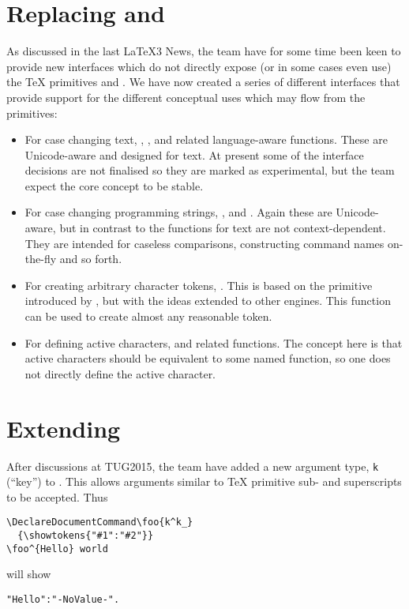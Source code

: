\documentclass{ltnews}
\begin{document}
\section{Replacing  and }

As discussed in the last \LaTeX3 News, the team have for some time been keen to
provide new interfaces which do not directly expose (or in some cases even use)
the \TeX{} primitives  and . We have now created a
series of different interfaces that provide support for the different
conceptual uses which may flow from the primitives:
\begin{itemize}
  \item For case changing text, , ,
     and related language-aware functions. These are
    Unicode-aware and designed for text. At present some of the interface
    decisions are not finalised so they are marked as experimental, but the team
    expect the core concept to be stable.
  \item For case changing programming strings, ,
     and . Again these are
    Unicode-aware, but in contrast to the functions for text are not
    context-dependent. They are intended for caseless comparisons, constructing
    command names on-the-fly and so forth.
  \item For creating arbitrary character tokens, . This
    is based on the  primitive introduced by , but
    with the ideas extended to other engines. This function can be used to
    create almost any reasonable token.
  \item For defining active characters,  and
    related functions. The concept here is that active characters should be
    equivalent to some named function, so one does not directly define the
    active character.
\end{itemize}

\section{Extending }

After discussions at TUG2015, the team have added a new argument type,
\texttt{k} (\enquote{key}) to . This allows arguments similar to
\TeX{} primitive sub- and superscripts to be accepted. Thus
\begin{verbatim}
\DeclareDocumentCommand\foo{k^k_}
  {\showtokens{"#1":"#2"}}
\foo^{Hello} world
\end{verbatim}
will show
\begin{verbatim}
"Hello":"-NoValue-".
\end{verbatim}
\end{document}
